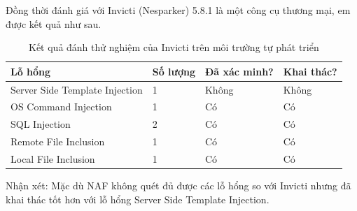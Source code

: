 \documentclass[./../main.tex]{subfiles}
\begin{document}
Đồng thời đánh giá với Invicti (Nesparker) 5.8.1 là một công cụ thương mại,
em được kết quả như sau.
\begin{table}[H]
	\begin{tabular}{|l|l|l|l|}
		\hline
		\textbf{Lỗ hổng}               & \textbf{Số lượng} & \textbf{Đã xác minh?} & \textbf{Khai thác?} \\ \hline
		Server Side Template Injection & 1                 & Không                 & Không               \\ \hline
		OS Command Injection           & 1                 & Có                    & Có                  \\ \hline
		SQL Injection                  & 2                 & Có                    & Có                  \\ \hline
		Remote File Inclusion          & 1                 & Có                    & Có                  \\ \hline
		Local File Inclusion           & 1                 & Có                    & Có                  \\ \hline
	\end{tabular}
	\caption{Kết quả đánh thử nghiệm của Invicti trên môi trường tự phát triển}

\end{table}

Nhận xét: Mặc dù NAF không quét đủ được các lỗ hổng so với Invicti nhưng
đã khai thác tốt hơn với lỗ hổng Server Side Template Injection.






\end{document}
